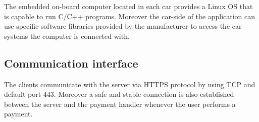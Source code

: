 The embedded on-board computer located in each car provides a Linux OS that is capable to run C/C++ programs. Moreover the car-side of the application can use specific software libraries provided by the manufacturer to access the car systems the computer is connected with.

\subsection{Communication interface}
The clients communicate with the server via HTTPS protocol by using TCP and default port 443.
Moreover a safe and stable connection is also established between the server and the payment handler whenever the user performs a payment.